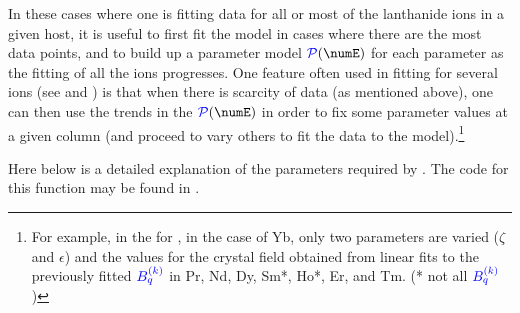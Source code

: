 \documentclass[11pt, twoside,openright]{article}
\begin{document}
In these cases where one is fitting data for all or most of the lanthanide ions in a given host, it is  useful to first fit the model in cases where there are the most data points, and to  build up a parameter model $\Param(\numE)$ for each parameter as the fitting of all the ions progresses. One feature often used in fitting for several ions (see \bill and \cheng) is that when there is scarcity of data (as mentioned above), one can then use the trends in the $\Param(\numE)$ in order to fix some parameter values at a given column (and proceed to vary others to fit the data to the model).\footnote{For example, in the  for \LaFthree, in the case of Yb, only two parameters are varied ($\zeta$ and $\epsilon$) and the values for the crystal field obtained from linear fits to the previously fitted $\textcolor{blue}{B^{(k)}_{q}}$ in Pr, Nd, Dy,  Sm*, Ho*, Er, and Tm. (* not all $\textcolor{blue}{B^{(k)}_{q}}$)}

Here below is a detailed explanation of the parameters required by . The code for this function  may be found in .
\end{document}
